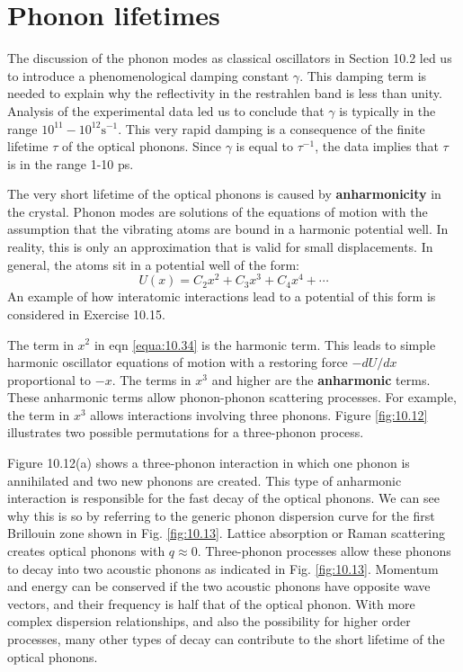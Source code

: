 \documentclass[12pt]{book}
\begin{document}
\section{Phonon lifetimes}
The discussion of the phonon modes as classical oscillators in Section 10.2 led us to introduce a phenomenological damping constant $\gamma$. This damping term is needed to explain why the reflectivity in the restrahlen band is less than unity. Analysis of the experimental data led us to conclude that $\gamma$ is typically in the range $10^{11} -10^{12}\mathrm{s^{-1}}$. This very rapid damping is a consequence of the finite lifetime $\tau$ of the optical phonons. Since $\gamma$ is equal to $\tau^{-1}$, the data implies that $\tau$ is in the range 1-10 ps.


The very short lifetime of the optical phonons is caused by \textbf{anharmonicity} in the crystal. Phonon modes are solutions of the equations of motion with the assumption that the vibrating atoms are bound in a harmonic potential well. In reality, this is only an approximation that is valid for small displacements. In general, the atoms sit in a potential well of the form:
\begin{equation}\label{equa:10.34}
  U(x)=C_2x^2+C_3x^3+C_4x^4+\cdots
\end{equation}
An example of how interatomic interactions lead to a potential of this form is considered in Exercise 10.15.

The term in $x^2$ in eqn \ref{equa:10.34} is the harmonic term. This leads to simple harmonic oscillator equations of motion with a restoring force $-dU /dx$ proportional to $-x$. The terms in $x^3$ and higher are the \textbf{anharmonic} terms. These anharmonic terms allow phonon-phonon scattering processes. For example, the term in $x^3$ allows interactions involving three phonons. Figure \ref{fig:10.12} illustrates two possible permutations for a three-phonon process.

Figure 10.12(a) shows a three-phonon interaction in which one phonon is annihilated and two new phonons are created. This type of anharmonic interaction is responsible for the fast decay of the optical phonons. We can see why this is so by referring to the generic phonon dispersion curve for the first Brillouin zone shown in Fig. \ref{fig:10.13}. Lattice absorption or Raman scattering creates optical phonons with $q\approx0$. Three-phonon processes allow these phonons to decay into two acoustic phonons as indicated in Fig. \ref{fig:10.13}. Momentum and energy can be conserved if the two acoustic phonons have opposite wave vectors, and their frequency is half that of the optical phonon. With more complex dispersion relationships, and also the possibility for higher order processes, many other types of decay can contribute to the short lifetime of the optical phonons.
\end{document}
